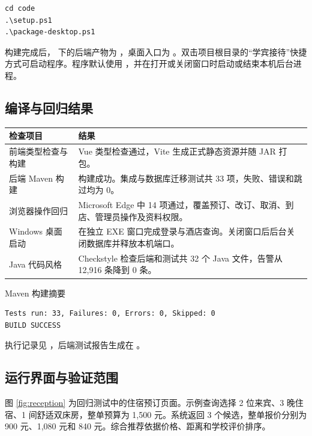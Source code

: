 \documentclass[UTF8,zihao=-4,fontset=windows]{ctexart}
\begin{document}
{\small
\begin{verbatim}
cd code
.\setup.ps1
.\package-desktop.ps1
\end{verbatim}
}

构建完成后， 下的后端产物为 ，桌面入口为 。双击项目根目录的“学宾接待”快捷方式可启动程序。程序默认使用 ，并在打开或关闭窗口时启动或结束本机后台进程。

\subsection{编译与回归结果}

{\small
\noindent\begin{tabularx}{\linewidth}{@{}p{38mm}Y@{}}
\toprule
\textbf{检查项目} & \textbf{结果} \\
\midrule
前端类型检查与构建 & Vue 类型检查通过，Vite 生成正式静态资源并随 JAR 打包。 \\
后端 Maven 构建 & 构建成功。集成与数据库迁移测试共 33 项，失败、错误和跳过均为 0。 \\
浏览器操作回归 & Microsoft Edge 中 14 项通过，覆盖预订、改订、取消、到店、管理员操作及资料权限。 \\
Windows 桌面启动 & 在独立 EXE 窗口完成登录与酒店查询。关闭窗口后后台关闭数据库并释放本机端口。 \\
Java 代码风格 & Checkstyle 检查后端和测试共 32 个 Java 文件，告警从 12,916 条降到 0 条。 \\
\bottomrule
\end{tabularx}\par
}

\noindent Maven 构建摘要
{\small
\begin{verbatim}
Tests run: 33, Failures: 0, Errors: 0, Skipped: 0
BUILD SUCCESS
\end{verbatim}
}
执行记录见 ，后端测试报告生成在 。

\clearpage

\subsection{运行界面与验证范围}

图 \ref{fig:reception} 为回归测试中的住宿预订页面。示例查询选择 2 位来宾、3 晚住宿、1 间舒适双床房，整单预算为 1,500 元。系统返回 3 个候选，整单报价分别为 900 元、1,080 元和 840 元。综合推荐依据价格、距离和学校评价排序。
\end{document}
